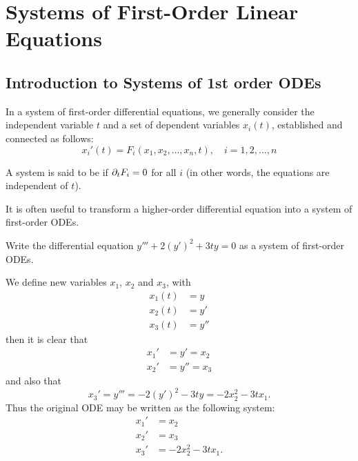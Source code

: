 \section{Systems of First-Order Linear Equations}\label{sec:firstorder}

\subsection{Introduction to Systems of 1st order ODEs}

In a system of first-order differential equations, we generally consider the independent variable $t$ and a set of dependent variables $x_i(t)$, established and connected as follows:
\[
x_i'(t) = F_i(x_1, x_2, \ldots, x_n, t), \quad i = 1, 2, \ldots, n
\]

A system is said to be  if $\partial_t F_i = 0$ for all $i$ (in other words, the equations are independent of $t$).

It is often useful to transform a higher-order differential equation into a system of first-order ODEs.

\begin{eg}
	Write the differential equation $y''' + 2(y')^2 + 3ty = 0$ as a system of first-order ODEs.
	
	We define new variables $x_1$, $x_2$ and $x_3$, with
	\begin{align*}
		x_1(t) &= y \\
		x_2(t) &= y' \\
		x_3(t) &= y''
	\end{align*}
	then it is clear that
	\begin{align*}
		x_1' &= y' = x_2 \\
		x_2' &= y'' = x_3
	\end{align*}
	and also that
	\[
	x_3' = y''' = -2(y')^2 - 3ty = -2x_2^2 - 3t x_1. 
	\]
	Thus the original ODE may be written as the following system:
	\begin{align*}
		x_1' &= x_2 \\
		x_2' &= x_3 \\
		x_3' &= -2x_2^2 - 3t x_1.
	\end{align*}
\end{eg}

